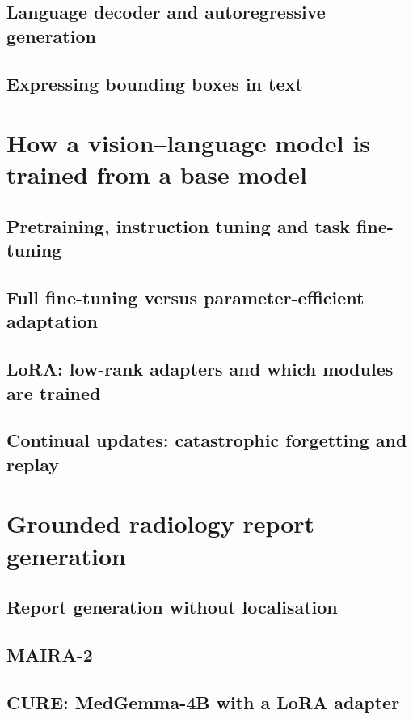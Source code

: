 \subsection{Language decoder and autoregressive generation}
\subsection{Expressing bounding boxes in text}

\section{How a vision--language model is trained from a base model}
\subsection{Pretraining, instruction tuning and task fine-tuning}
\subsection{Full fine-tuning versus parameter-efficient adaptation}
\subsection{LoRA: low-rank adapters and which modules are trained}
\subsection{Continual updates: catastrophic forgetting and replay}

\section{Grounded radiology report generation}
\subsection{Report generation without localisation}
\subsection{MAIRA-2}
\subsection{CURE: MedGemma-4B with a LoRA adapter}

